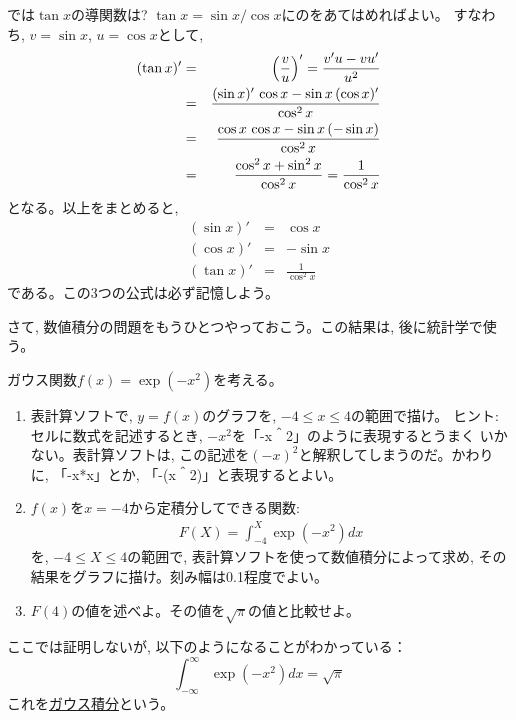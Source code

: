 では$\tan x$の導関数は? $\tan x=\sin x/\cos x$にのをあてはめればよい。
すなわち, $v=\sin x$, $u=\cos x$として, 
\begin{eqnarray}
(\tan x)'&=&\Bigl(\frac{v}{u}\Bigr)'=\frac{v'u-vu'}{u^2}\nonumber\\
&=&\frac{(\sin x)'\,\cos x-\sin x\,(\cos x)'}{\cos^2x}\nonumber\\
&=&\frac{\cos x\,\cos x-\sin x\,(-\sin x)}{\cos^2x}\nonumber\\
&=&\frac{\cos^2 x+\sin^2 x}{\cos^2x}=\frac{1}{\cos^2 x}\label{eq:difftan}
\end{eqnarray}
となる。以上をまとめると, 
\begin{eqnarray}
(\sin x)'&=&\cos x\label{eq:diff_sinx}\\
(\cos x)'&=&-\sin x\label{eq:diff_cosx}\\
(\tan x)'&=&\frac{1}{\cos^2 x}\label{eq:diff_tanx}
\end{eqnarray}
である。この3つの公式は必ず記憶しよう。




さて, 数値積分の問題をもうひとつやっておこう。この結果は, 後に統計学で使う。

\begin{q}\label{q:comp_int4} ガウス関数$f(x)=\exp (-x^2)$を考える。
\begin{enumerate}
\item 表計算ソフトで, $y=f(x)$のグラフを, $-4\leq x\leq 4$の範囲で描け。
ヒント: セルに数式を記述するとき, $-x^2$を「-x＾2」のように表現するとうまく
いかない。表計算ソフトは, この記述を$(-x)^2$と解釈してしまうのだ。かわりに, 
「-x*x」とか, 「-(x＾2)」と表現するとよい。
\item $f(x)$を$x=-4$から定積分してできる関数:
\begin{eqnarray}F(X)=\int_{-4}^{X}\exp(-x^2)dx\end{eqnarray}
を, $-4 \le X \le 4$の範囲で, 表計算ソフトを使って数値積分によって求め, 
その結果をグラフに描け。刻み幅は0.1程度でよい。
\item $F(4)$の値を述べよ。その値を$\sqrt{\pi}$の値と比較せよ。
\end{enumerate}
ここでは証明しないが, 以下のようになることがわかっている：
\begin{equation}\int_{-\infty}^{\infty} \exp(-x^2) dx=\sqrt{\pi}
\label{eq:integ_Gauss_func}\end{equation}
これを\underline{ガウス積分}という。
\end{q}
\vv



